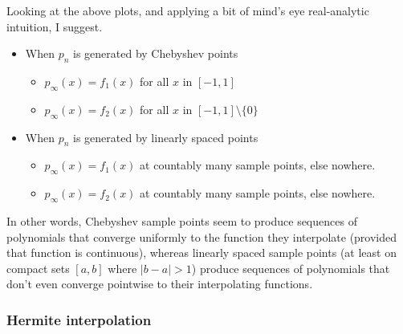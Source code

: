 \documentclass{article}
\providecommand{\tightlist}{%
      \setlength{\itemsep}{0pt}\setlength{\parskip}{0pt}}
\begin{document}
Looking at the above plots, and applying a bit of mind's eye
real-analytic intuition, I suggest.

\begin{itemize}
\item
  When \(p_n\) is generated by Chebyshev points

  \begin{itemize}
  \tightlist
  \item
    \(p_\infty(x) = f_1(x)\) for all \(x\) in \([-1,1]\)
  \item
    \(p_\infty(x) = f_2(x)\) for all \(x\) in \([-1,1]\setminus \{0\}\)
  \end{itemize}
\item
  When \(p_n\) is generated by linearly spaced points

  \begin{itemize}
  \tightlist
  \item
    \(p_\infty(x) = f_1(x)\) at countably many sample points, else
    nowhere.
  \item
    \(p_\infty(x) = f_2(x)\) at countably many sample points, else
    nowhere.
  \end{itemize}
\end{itemize}

In other words, Chebyshev sample points seem to produce sequences of
polynomials that converge uniformly to the function they interpolate
(provided that function is continuous), whereas linearly spaced sample
points (at least on compact sets \([a,b]\) where
\(\lvert b-a \rvert > 1\)) produce sequences of polynomials that don't
even converge pointwise to their interpolating functions.

\hypertarget{hermite-interpolation}{%
\subsubsection{Hermite interpolation}\label{hermite-interpolation}}


    
    
    
    
\end{document}
